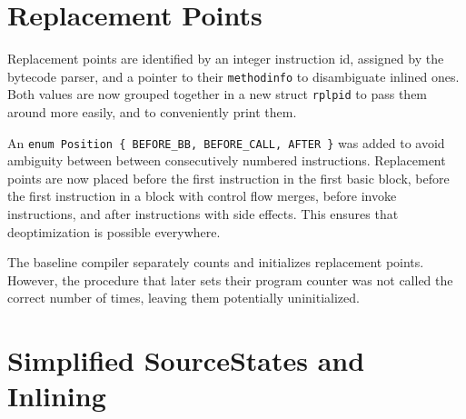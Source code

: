 \documentclass[draft,final]{vutinfth} %
\begin{document}
    \section{Replacement Points}

    Replacement points are identified by an integer instruction id, assigned by the bytecode parser,
    and a pointer to their \lstinline{methodinfo} to disambiguate inlined ones.
    Both values are now grouped together in a new struct \lstinline{rplpid}
    to pass them around more easily, and to conveniently print them.

    An \lstinline|enum Position { BEFORE_BB, BEFORE_CALL, AFTER }|
    was added
    to avoid ambiguity between between consecutively numbered instructions.
    Replacement points are now placed
    before the first instruction in the first basic block,
    before the first instruction in a block with control flow merges,
    before invoke instructions,
    and after instructions with side effects.
    This ensures that deoptimization is possible everywhere.

    The baseline compiler separately counts and initializes replacement points.
    However, the procedure that later sets their program counter was not called the correct number of times,
    leaving them potentially uninitialized.


    \section{Simplified SourceStates and Inlining}
\end{document}
